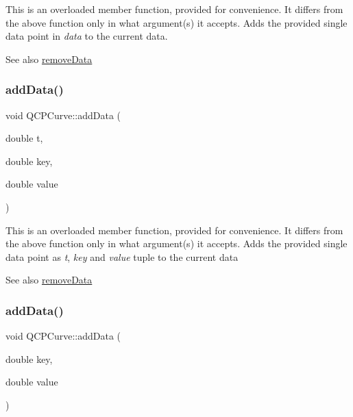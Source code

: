 This is an overloaded member function, provided for convenience. It differs from the above function only in what argument(s) it accepts. Adds the provided single data point in {\itshape data} to the current data. \begin{DoxySeeAlso}{See also}
\hyperlink{class_q_c_p_curve_ad45bb5479be799163028ef2b776f7221}{remove\+Data} 
\end{DoxySeeAlso}
\hypertarget{class_q_c_p_curve_a13398b236f6926014e404eeb5b9f415c}{}\label{class_q_c_p_curve_a13398b236f6926014e404eeb5b9f415c} 
\subsubsection{\texorpdfstring{add\+Data()}{addData()}\hspace{0.1cm}{\footnotesize\ttfamily [3/5]}}
{\footnotesize\ttfamily void Q\+C\+P\+Curve\+::add\+Data (\begin{DoxyParamCaption}\item[{double}]{t,  }\item[{double}]{key,  }\item[{double}]{value }\end{DoxyParamCaption})}

This is an overloaded member function, provided for convenience. It differs from the above function only in what argument(s) it accepts. Adds the provided single data point as {\itshape t}, {\itshape key} and {\itshape value} tuple to the current data \begin{DoxySeeAlso}{See also}
\hyperlink{class_q_c_p_curve_ad45bb5479be799163028ef2b776f7221}{remove\+Data} 
\end{DoxySeeAlso}
\hypertarget{class_q_c_p_curve_ada4762e793cd5707b33f35b8a4b0f8fb}{}\label{class_q_c_p_curve_ada4762e793cd5707b33f35b8a4b0f8fb} 
\subsubsection{\texorpdfstring{add\+Data()}{addData()}\hspace{0.1cm}{\footnotesize\ttfamily [4/5]}}
{\footnotesize\ttfamily void Q\+C\+P\+Curve\+::add\+Data (\begin{DoxyParamCaption}\item[{double}]{key,  }\item[{double}]{value }\end{DoxyParamCaption})}

